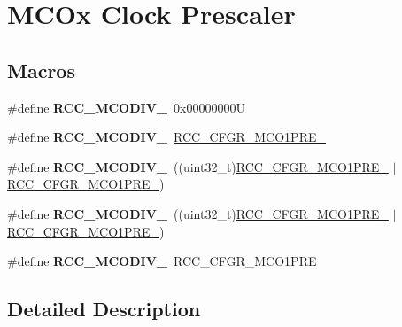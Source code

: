 \hypertarget{group___r_c_c___m_c_ox___clock___prescaler}{}\section{M\+C\+Ox Clock Prescaler}
\label{group___r_c_c___m_c_ox___clock___prescaler}
\subsection*{Macros}
\begin{DoxyCompactItemize}
\item 
\mbox{\label{group___r_c_c___m_c_ox___clock___prescaler_ga438d8c3bead4e1ec5dd5757cb0313d53}} 
\#define {\bfseries R\+C\+C\+\_\+\+M\+C\+O\+D\+I\+V\+\_}~0x00000000U
\item 
\mbox{\label{group___r_c_c___m_c_ox___clock___prescaler_ga6198330847077f4da351915518140bfc}} 
\#define {\bfseries R\+C\+C\+\_\+\+M\+C\+O\+D\+I\+V\+\_}~\hyperlink{group___peripheral___registers___bits___definition_ga11e1d10d1b55e0d88d24212ea2c8ba6e}{R\+C\+C\+\_\+\+C\+F\+G\+R\+\_\+\+M\+C\+O1\+P\+R\+E\+\_}
\item 
\mbox{\label{group___r_c_c___m_c_ox___clock___prescaler_gab9dac03733c3c5bd8877ef43bff3d5f4}} 
\#define {\bfseries R\+C\+C\+\_\+\+M\+C\+O\+D\+I\+V\+\_}~((uint32\+\_\+t)\hyperlink{group___peripheral___registers___bits___definition_gac8007a9d6ee3fd88912aaf290746ae0e}{R\+C\+C\+\_\+\+C\+F\+G\+R\+\_\+\+M\+C\+O1\+P\+R\+E\+\_} $\vert$ \hyperlink{group___peripheral___registers___bits___definition_ga11e1d10d1b55e0d88d24212ea2c8ba6e}{R\+C\+C\+\_\+\+C\+F\+G\+R\+\_\+\+M\+C\+O1\+P\+R\+E\+\_})
\item 
\mbox{\label{group___r_c_c___m_c_ox___clock___prescaler_ga1bdc2eb56aaeb53dc3ca5cd72f22d4c8}} 
\#define {\bfseries R\+C\+C\+\_\+\+M\+C\+O\+D\+I\+V\+\_}~((uint32\+\_\+t)\hyperlink{group___peripheral___registers___bits___definition_gaaf7c1280f61d56b4897f9c876987e092}{R\+C\+C\+\_\+\+C\+F\+G\+R\+\_\+\+M\+C\+O1\+P\+R\+E\+\_} $\vert$ \hyperlink{group___peripheral___registers___bits___definition_ga11e1d10d1b55e0d88d24212ea2c8ba6e}{R\+C\+C\+\_\+\+C\+F\+G\+R\+\_\+\+M\+C\+O1\+P\+R\+E\+\_})
\item 
\mbox{\label{group___r_c_c___m_c_ox___clock___prescaler_ga67292dd05ceb8189ec439d4ac4d58b88}} 
\#define {\bfseries R\+C\+C\+\_\+\+M\+C\+O\+D\+I\+V\+\_}~R\+C\+C\+\_\+\+C\+F\+G\+R\+\_\+\+M\+C\+O1\+P\+RE
\end{DoxyCompactItemize}


\subsection{Detailed Description}
